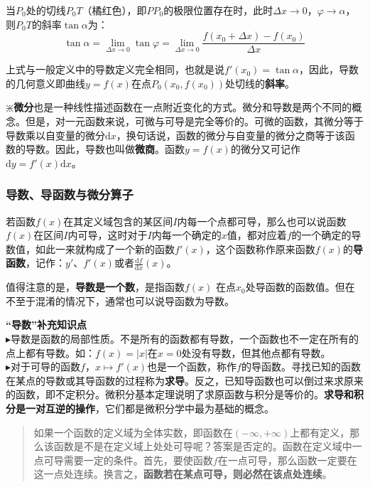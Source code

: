 \documentclass[UTF8]{ctexart}
\begin{document}
{当$P_0$处的切线$P_0 T$（橘红色），即$P P_0$的极限位置存在时，此时$\Delta x \to 0$，$\varphi \to \alpha$，则$P_0 T$的斜率$\tan \alpha$为：
\begin{equation}
	\tan \alpha =\lim _{\Delta x\to 0} \tan \varphi =\lim _{\Delta x\to 0}\frac {f(x_{0}+\Delta x)-f(x_{0})}{\Delta x}
\end{equation}

上式与一般定义中的导数定义完全相同，也就是说$f'(x_0)=\tan \alpha$，因此，导数的几何意义即曲线$y=f(x)$在点$P_0(x_0,f(x_0))$处切线的\textbf{斜率}。

\begin{question}
	$\divideontimes$\textbf{微分}也是一种线性描述函数在一点附近变化的方式。微分和导数是两个不同的概念。但是，对一元函数来说，可微与可导是完全等价的。可微的函数，其微分等于导数乘以自变量的微分$\mathrm{d}x$，换句话说，函数的微分与自变量的微分之商等于该函数的导数。因此，导数也叫做\textbf{微商}。函数$y = f(x)$的微分又可记作$\mathrm{d}y = f'(x)\mathrm{d}x$。
\end{question}
\subsubsection{导数、导函数与微分算子}
若函数$f(x)$在其定义域包含的某区间$I$内每一个点都可导，那么也可以说函数$f(x)$在区间$I$内可导，这时对于$I$内每一个确定的$x$值，都对应着$f$的一个确定的导数值，如此一来就构成了一个新的函数$f'(x)$，这个函数称作原来函数$f(x)$的\textbf{导函数}，记作：$y'$、$f'(x)$或者$\tfrac  {\mathrm {d}f}{\mathrm  {d}x}(x)$。

值得注意的是，\textbf{导数是一个数}，是指函数$f(x)$ 在点$x_0$处导函数的函数值。但在不至于混淆的情况下，通常也可以说导函数为导数。
\begin{info}[Notice:]\textbf{“导数”补充知识点}\\
	$\blacktriangleright$导数是函数的局部性质。不是所有的函数都有导数，一个函数也不一定在所有的点上都有导数。如：$f(x)=|x|$在$x=0$处没有导数，但其他点都有导数。\\
    $\blacktriangleright$对于可导的函数$f$，$x \mapsto f'(x)$也是一个函数，称作$f$的导函数。寻找已知的函数在某点的导数或其导函数的过程称为\textbf{求导}。反之，已知导函数也可以倒过来求原来的函数，即不定积分。微积分基本定理说明了求原函数与积分是等价的。\textbf{求导和积分是一对互逆的操作}，它们都是微积分学中最为基础的概念。
\end{info}
\begin{quote}
	如果一个函数的定义域为全体实数，即函数在$(-\infty,+\infty)$上都有定义，那么该函数是不是在定义域上处处可导呢？答案是否定的。函数在定义域中一点可导需要一定的条件。首先，要使函数$f$在一点可导，那么函数一定要在这一点处连续。换言之，\textbf{函数若在某点可导，则必然在该点处连续}。
\end{quote}

}
\end{document}
